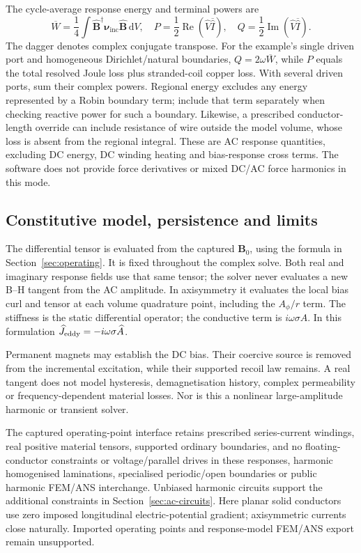 The cycle-average response energy and terminal powers are
\[
 \overline W=\frac14\int
 \widehat{\mathbf B}^{\dagger}\boldsymbol\nu_{\mathrm{inc}}
 \widehat{\mathbf B}\,\mathrm dV,\quad
 P=\frac12\operatorname{Re}(\widehat V\overline{\widehat I}),\quad
 Q=\frac12\operatorname{Im}(\widehat V\overline{\widehat I}).
\]
The dagger denotes complex conjugate transpose. For the example's single
driven port and homogeneous Dirichlet/natural boundaries,
$Q=2\omega\overline W$, while $P$ equals the total resolved Joule loss plus
stranded-coil copper loss. With several driven ports, sum their complex powers.
Regional energy excludes any energy represented by a Robin boundary term;
include that term separately when checking reactive power for such a boundary.
Likewise, a prescribed conductor-length override can include resistance of wire
outside the model volume, whose loss is absent from the regional integral.
These are AC response quantities, excluding DC
energy, DC winding heating and bias-response cross terms. The software does
not provide force derivatives or mixed DC/AC force harmonics in this mode.

\subsection{Constitutive model, persistence and limits}
The differential tensor is evaluated from the captured $\mathbf B_0$, using
the formula in Section~\ref{sec:operating}. It is fixed throughout the complex
solve. Both real and imaginary response fields use that same tensor; the
solver never evaluates a new B--H tangent from the AC amplitude. In axisymmetry
it evaluates the local bias curl and tensor at each volume quadrature point,
including the $A_\phi/r$ term. The stiffness is the static differential
operator; the conductive term is $i\omega\sigma A$. In this formulation
$\widehat J_{\rm eddy}=-i\omega\sigma\widehat A$.

Permanent magnets may establish the DC bias. Their coercive source is removed
from the incremental excitation, while their supported recoil law remains.
A real tangent does not model hysteresis, demagnetisation history, complex
permeability or frequency-dependent material losses. Nor is this a nonlinear
large-amplitude harmonic or transient solver.

The captured operating-point interface retains prescribed series-current
windings, real positive material tensors, supported ordinary boundaries, and
no floating-conductor constraints or voltage/parallel drives in these responses,
harmonic homogenised laminations, specialised periodic/open boundaries or
public harmonic FEM/ANS interchange. Unbiased harmonic circuits support the
additional constraints in Section~\ref{sec:ac-circuits}. Here planar solid conductors use zero imposed
longitudinal electric-potential gradient; axisymmetric currents close naturally.
Imported operating points and response-model FEM/ANS export remain unsupported.

